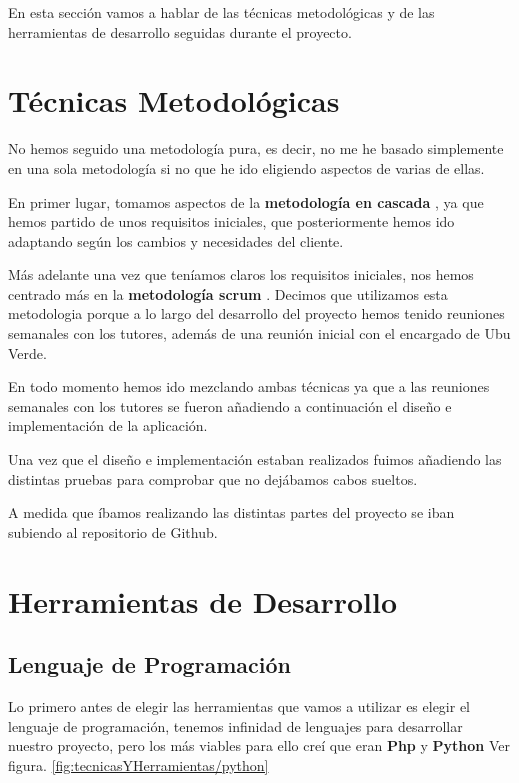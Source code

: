 En esta sección vamos a hablar de las técnicas metodológicas y de las herramientas de desarrollo seguidas durante el proyecto.

\section{Técnicas Metodológicas}
No hemos seguido una metodología pura, es decir, no me he basado simplemente en una sola metodología si no que he ido eligiendo aspectos de varias de ellas.

En primer lugar, tomamos aspectos de la \textbf{metodología en cascada} \cite{ModeloenCascada}, ya que hemos partido de unos requisitos iniciales, que posteriormente hemos ido adaptando según los cambios y necesidades del cliente.

Más adelante una vez que teníamos claros los requisitos iniciales, nos hemos centrado más en la \textbf{metodología scrum} \cite{MetodologiaScrum}. Decimos que utilizamos esta metodologia porque a lo largo del desarrollo del proyecto hemos tenido reuniones semanales con los tutores, además de una reunión inicial con el encargado de Ubu Verde.

En todo momento hemos ido mezclando ambas técnicas ya que a las reuniones semanales con los tutores se fueron añadiendo a continuación el diseño e implementación de la aplicación.

Una vez que el diseño e implementación estaban realizados fuimos añadiendo las distintas pruebas para comprobar que no dejábamos cabos sueltos.

A medida que íbamos realizando las distintas partes del proyecto se iban subiendo al repositorio de Github.

\section{Herramientas de Desarrollo}

\subsection{Lenguaje de Programación}
Lo primero antes de elegir las herramientas que vamos a utilizar es elegir el lenguaje de programación, tenemos infinidad de lenguajes para desarrollar nuestro proyecto, pero los más viables para ello creí que eran \textbf{Php} \cite{Php} y \textbf{Python} \cite{Python} Ver figura. \ref{fig:tecnicasYHerramientas/python}


